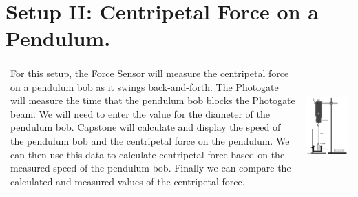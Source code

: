 \documentclass[main.tex]{subfiles}
\begin{document}
\section{Setup II: Centripetal Force on a Pendulum.}
\begin{tabular}{ll}
\begin{minipage}{0.5\textwidth}
For this setup, the Force Sensor will measure the centripetal force on a pendulum bob as it swings back-and-forth. The Photogate will measure the time that the pendulum bob blocks the Photogate beam. We will need to enter the value for the diameter of the pendulum bob. Capstone will calculate and display the speed of the pendulum bob and the centripetal force on the pendulum. We can then use this data to calculate centripetal force based on the measured speed of the pendulum bob. Finally we can compare the calculated and measured values of the centripetal force.
\end{minipage}
&
\begin{minipage}{0.5\textwidth}
\centering
\includegraphics[width=\textwidth]{CenForce_2_Setup}
\end{minipage}
\end{tabular}
\end{document}
